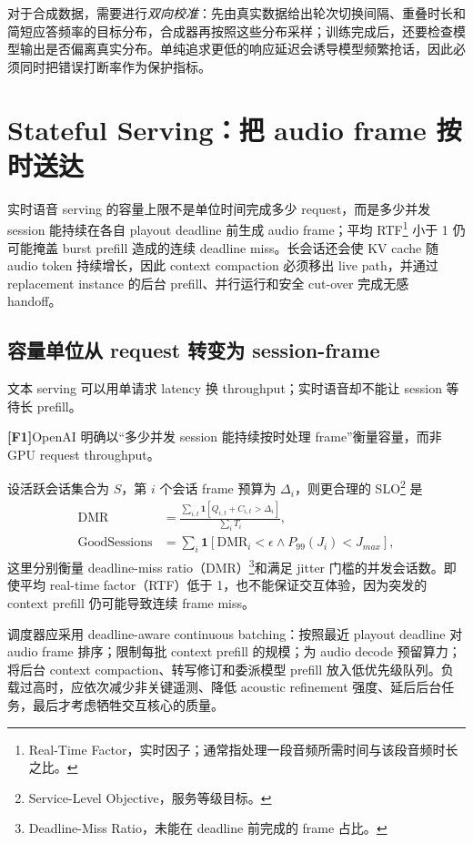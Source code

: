 \documentclass[UTF8,fontset=none,a4paper,10pt]{ctexart}
\newcommand{\FOne}{\textcolor{official}{\textbf{[F1]}}}
\begin{document}
对于合成数据，需要进行\emph{双向校准}：先由真实数据给出轮次切换间隔、重叠时长和简短应答频率的目标分布，合成器再按照这些分布采样；训练完成后，还要检查模型输出是否偏离真实分布。单纯追求更低的响应延迟会诱导模型频繁抢话，因此必须同时把错误打断率作为保护指标。

\section{Stateful Serving：把 audio frame 按时送达}

实时语音 serving 的容量上限不是单位时间完成多少 request，而是多少并发 session 能持续在各自 playout deadline 前生成 audio frame；平均 RTF\footnote{Real-Time Factor，实时因子；通常指处理一段音频所需时间与该段音频时长之比。} 小于 1 仍可能掩盖 burst prefill 造成的连续 deadline miss。长会话还会使 KV cache 随 audio token 持续增长，因此 context compaction 必须移出 live path，并通过 replacement instance 的后台 prefill、并行运行和安全 cut-over 完成无感 handoff。

\subsection{容量单位从 request 转变为 session-frame}

文本 serving 可以用单请求 latency 换 throughput；实时语音却不能让 session 等待长 prefill。

\FOne OpenAI 明确以“多少并发 session 能持续按时处理 frame”衡量容量，而非 GPU request throughput\cite{openai2026continuous}。

设活跃会话集合为 $S$，第 $i$ 个会话 frame 预算为 $\Delta_i$，则更合理的 SLO\footnote{Service-Level Objective，服务等级目标。} 是
\begin{align}
\mathrm{DMR} &= \frac{\sum_{i,t}\mathbf 1[Q_{i,t}+C_{i,t}>\Delta_i]}{\sum_iT_i},\\
\mathrm{GoodSessions} &= \sum_i\mathbf 1[\mathrm{DMR}_i<\epsilon\land P_{99}(J_i)<J_{max}],
\end{align}
这里分别衡量 deadline-miss ratio（DMR）\footnote{Deadline-Miss Ratio，未能在 deadline 前完成的 frame 占比。}和满足 jitter 门槛的并发会话数。即使平均 real-time factor（RTF）低于 1，也不能保证交互体验，因为突发的 context prefill 仍可能导致连续 frame miss。

调度器应采用 deadline-aware continuous batching：按照最近 playout deadline 对 audio frame 排序；限制每批 context prefill 的规模；为 audio decode 预留算力；将后台 context compaction、转写修订和委派模型 prefill 放入低优先级队列。负载过高时，应依次减少非关键遥测、降低 acoustic refinement 强度、延后后台任务，最后才考虑牺牲交互核心的质量。
\end{document}
